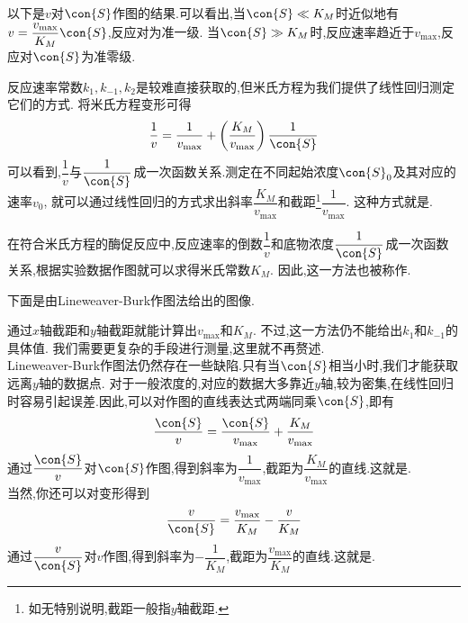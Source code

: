 \documentclass{ctexart}
\begin{document}
以下是$v$对$\con{S}$作图的结果.可以看出,当$\con{S}\ll K_M$时近似地有$v=\dfrac{v_{\max}}{K_M}\con{S}$,反应对为准一级.%
当$\con{S}\gg K_M$时,反应速率趋近于$v_{\max}$,反应对$\con{S}$为准零级.
\begin{tightcenter}
    
\end{tightcenter}
\indent 反应速率常数$k_1,k_{-1},k_2$是较难直接获取的,但米氏方程为我们提供了线性回归测定它们的方式.%
将米氏方程变形可得
\[\dfrac{1}{v}=\dfrac{1}{v_{\max}}+\left(\dfrac{K_M}{v_{\max}}\right)\dfrac{1}{\con{S}}\]
可以看到,$\dfrac{1}{v}$与$\dfrac{1}{\con{S}}$成一次函数关系.测定在不同起始浓度$\con{S}_0$及其对应的速率$v_0$,%
就可以通过线性回归的方式求出斜率$\dfrac{K_M}{v_{\max}}$和截距\footnote{如无特别说明,截距一般指$y$轴截距.}$\dfrac{1}{v_{\max}}$.%
这种方式就是\footnotemark{}.
\begin{theorem}
    在符合米氏方程的酶促反应中,反应速率的倒数$\dfrac1v$和底物浓度$\dfrac{1}{\con{S}}$成一次函数关系,根据实验数据作图就可以求得米氏常数$K_M$.%
    因此,这一方法也被称作.
\end{theorem}
下面是由Lineweaver-Burk作图法给出的图像.
\begin{tightcenter}
    
\end{tightcenter}
通过$x$轴截距和$y$轴截距就能计算出$v_{\max}$和$K_{M}$.%
不过,这一方法仍不能给出$k_1$和$k_{-1}$的具体值.%
我们需要更复杂的手段进行测量,这里就不再赘述.\\
\indent Lineweaver-Burk作图法仍然存在一些缺陷.只有当$\con{S}$相当小时,我们才能获取远离$y$轴的数据点.%
对于一般浓度的,对应的数据大多靠近$y$轴,较为密集,在线性回归时容易引起误差.因此,可以对作图的直线表达式两端同乘$\con{S}$,即有
\[\dfrac{\con{S}}{v}=\dfrac{\con{S}}{v_{\max}}+\dfrac{K_{M}}{v_{\max}}\]
通过$\dfrac{\con{S}}{v}$对$\con{S}$作图,得到斜率为$\dfrac{1}{v_{\max}}$,截距为$\dfrac{K_M}{v_{\max}}$的直线.这就是.\\
\indent 当然,你还可以对变形得到
\[\dfrac{v}{\con{S}}=\dfrac{v_{\max}}{K_M}-\dfrac{v}{K_M}\]
通过$\dfrac{v}{\con{S}}$对$v$作图,得到斜率为$-\dfrac{1}{K_M}$,截距为$\dfrac{v_{\max}}{K_M}$的直线.这就是.\vspace{4pt}\\
\end{document}
